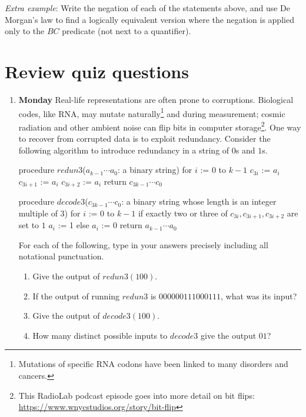 \documentclass[12pt, oneside]{article}
\begin{document}
{\it Extra example}: Write the negation of each of the statements above, and use De Morgan's law to find a 
logically equivalent version where the negation is applied only to the $BC$ predicate (not next to a quantifier).




\section*{Review quiz questions}
\begin{enumerate}
\item {\bf Monday}
Real-life representations are often prone to corruptions.  Biological codes, like RNA, 
may mutate naturally\footnote{Mutations of specific RNA codons have been linked to many disorders and cancers.}
and during measurement; cosmic radiation and other ambient noise 
can flip bits in computer storage\footnote{This RadioLab podcast episode
goes into more detail on bit flips: \url{https://www.wnycstudios.org/story/bit-flip}}. 
One way to recover from corrupted data is to exploit redundancy.  
Consider the following algorithm to introduce redundancy in a string of $0$s and $1$s.
\begin{algorithm}[caption={Create redundancy by repeating each bit three times}]
procedure $\textit{redun3}$($a_{k-1} \cdots a_0$: a binary string)
for $i$ := $0$ to $k-1$
  $c_{3i}$ := $a_i$
  $c_{3i+1}$ := $a_i$
  $c_{3i+2}$ := $a_i$
return $c_{3k-1} \cdots c_0$
\end{algorithm}

\begin{algorithm}[caption={Decode sequence of bits using majority rule on consecutive three bit sequences}]
procedure $\textit{decode3}$($c_{3k-1} \cdots c_0$: a binary string whose length is an integer multiple of $3$)
for $i$ := $0$ to $k-1$
  if exactly two or three of $c_{3i}, c_{3i+1}, c_{3i+2}$ are set to $1$
    $a_i$ := 1
  else 
    $a_i$ := 0
return $a_{k-1} \cdots a_0$
\end{algorithm}

For each of the following, type in your answers precisely including all notational punctuation.

\begin{enumerate}
\item  Give the output of $redun3(100)$.
\item  If the output of running $redun3$ is $000000111000111$, what was its input?
\item  Give the output of $decode3(100)$.
\item  How many distinct possible inputs to $decode3$ give the output $01$?
\end{enumerate}


\end{enumerate}
\end{document}
